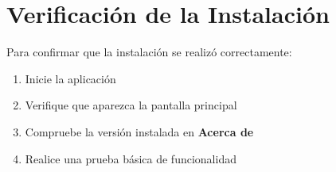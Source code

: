 \section{Verificación de la Instalación}

Para confirmar que la instalación se realizó correctamente:

\begin{enumerate}
    \item Inicie la aplicación
    \item Verifique que aparezca la pantalla principal
    \item Compruebe la versión instalada en \textbf{Acerca de}
    \item Realice una prueba básica de funcionalidad
\end{enumerate}

